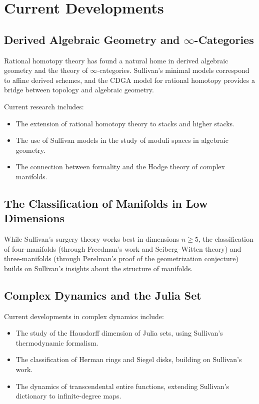 \section{Current Developments}

\subsection{Derived Algebraic Geometry and \texorpdfstring{$\infty$}{infinity}-Categories}

Rational homotopy theory has found a natural home in derived algebraic geometry and the theory of $\infty$-categories. Sullivan's minimal models correspond to affine derived schemes, and the CDGA model for rational homotopy provides a bridge between topology and algebraic geometry.

Current research includes:
\begin{itemize}
\item The extension of rational homotopy theory to stacks and higher stacks.
\item The use of Sullivan models in the study of moduli spaces in algebraic geometry.
\item The connection between formality and the Hodge theory of complex manifolds.
\end{itemize}

\subsection{The Classification of Manifolds in Low Dimensions}

While Sullivan's surgery theory works best in dimensions $n \geq 5$, the classification of four-manifolds (through Freedman's work and Seiberg--Witten theory) and three-manifolds (through Perelman's proof of the geometrization conjecture) builds on Sullivan's insights about the structure of manifolds.

\subsection{Complex Dynamics and the Julia Set}

Current developments in complex dynamics include:
\begin{itemize}
\item The study of the Hausdorff dimension of Julia sets, using Sullivan's thermodynamic formalism.
\item The classification of Herman rings and Siegel disks, building on Sullivan's work.
\item The dynamics of transcendental entire functions, extending Sullivan's dictionary to infinite-degree maps.
\end{itemize}

